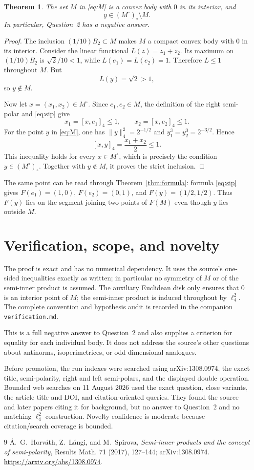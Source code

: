 \documentclass[11pt]{article}
\newtheorem{theorem}{Theorem}
\begin{document}
\begin{theorem}\label{thm:counterexample}
The set $M$ in \eqref{eq:M} is a convex body with $0$ in its interior, and
\[
 y\in(M^\circ)_\circ\setminus M.
\]
In particular, Question~2 has a negative answer.
\end{theorem}

\begin{proof}
The inclusion $(1/10)B_2\subset M$ makes $M$ a compact convex body with
$0$ in its interior.  Consider the linear functional
$L(z)=z_1+z_2$.  Its maximum on $(1/10)B_2$ is $\sqrt2/10<1$, while
$L(e_1)=L(e_2)=1$.  Therefore $L\leq1$ throughout $M$.  But
\[
 L(y)=\sqrt2>1,
\]
so $y\notin M$.

Now let $x=(x_1,x_2)\in M^\circ$.  Since $e_1,e_2\in M$, the definition of
the right semi-polar and \eqref{eq:sip} give
\[
 x_1=[x,e_1]_4\leq1,
 \qquad
 x_2=[x,e_2]_4\leq1.
\]
For the point $y$ in \eqref{eq:M}, one has $\|y\|_4^2=2^{-1/2}$ and
$y_1^3=y_2^3=2^{-3/2}$.  Hence
\[
 [x,y]_4=\frac{x_1+x_2}{2}\leq1.
\]
This inequality holds for every $x\in M^\circ$, which is precisely the
condition $y\in(M^\circ)_\circ$.  Together with $y\notin M$, it proves the
strict inclusion.
\end{proof}

The same point can be read through Theorem~\ref{thm:formula}: formula
\eqref{eq:sip} gives $F(e_1)=(1,0)$, $F(e_2)=(0,1)$, and
$F(y)=(1/2,1/2)$.  Thus $F(y)$ lies on the segment joining two points of
$F(M)$ even though $y$ lies outside $M$.

\section{Verification, scope, and novelty}

The proof is exact and has no numerical dependency.  It uses the source's
one-sided inequalities exactly as written; in particular no symmetry of
$M$ or of the semi-inner product is assumed.  The auxiliary Euclidean disk
only ensures that $0$ is an interior point of $M$; the semi-inner product is
induced throughout by $\ell_4^2$.  The complete convention and hypothesis
audit is recorded in the companion \texttt{verification.md}.

This is a full negative answer to Question~2 and also supplies a criterion
for equality for each individual body.  It does not address the source's
other questions about antinorms, isoperimetrices, or odd-dimensional
analogues.

Before promotion, the run indexes were searched using arXiv:1308.0974, the
exact title, semi-polarity, right and left semi-polars, and the displayed
double operation.  Bounded web searches on 11 August 2026 used the exact
question, close variants, the article title and DOI, and citation-oriented
queries.  They found the source and later papers citing it for background,
but no answer to Question~2 and no matching $\ell_4^2$ construction.
Novelty confidence is moderate because citation/search coverage is bounded.

\begin{thebibliography}{9}
\'A.~G.~Horv\'ath, Z.~L\'angi, and M.~Spirova,
\emph{Semi-inner products and the concept of semi-polarity},
Results Math. 71 (2017), 127--144;
arXiv:1308.0974.
\url{https://arxiv.org/abs/1308.0974}.
\end{thebibliography}
\end{document}
